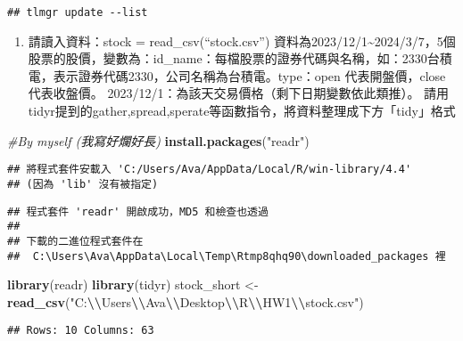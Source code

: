 \documentclass[
]{article}
\newenvironment{Shaded}{\begin{snugshade}}{\end{snugshade}}
\newcommand{\CommentTok}[1]{\textcolor[rgb]{0.56,0.35,0.01}{\textit{#1}}}
\newcommand{\FunctionTok}[1]{\textcolor[rgb]{0.13,0.29,0.53}{\textbf{#1}}}
\newcommand{\NormalTok}[1]{#1}
\newcommand{\OtherTok}[1]{\textcolor[rgb]{0.56,0.35,0.01}{#1}}
\newcommand{\SpecialCharTok}[1]{\textcolor[rgb]{0.81,0.36,0.00}{\textbf{#1}}}
\newcommand{\StringTok}[1]{\textcolor[rgb]{0.31,0.60,0.02}{#1}}
\providecommand{\tightlist}{%
  \setlength{\itemsep}{0pt}\setlength{\parskip}{0pt}}
\begin{document}
\begin{verbatim}
## tlmgr update --list
\end{verbatim}

\begin{enumerate}
\def\labelenumi{\arabic{enumi}.}
\tightlist
\item
  請讀入資料：stock = read\_csv(``stock.csv'')
  資料為2023/12/1\textasciitilde2024/3/7，5個股票的股價，變數為：id\_name：每檔股票的證券代碼與名稱，如：2330台積電，表示證券代碼2330，公司名稱為台積電。type：open
  代表開盤價，close 代表收盤價。
  2023/12/1：為該天交易價格（剩下日期變數依此類推）。
  請用tidyr提到的gather,spread,sperate等函數指令，將資料整理成下方「tidy」格式
\end{enumerate}

\begin{Shaded}
\begin{Highlighting}[]
\CommentTok{\#By myself (我寫好爛好長)}
\FunctionTok{install.packages}\NormalTok{(}\StringTok{"readr"}\NormalTok{)}
\end{Highlighting}
\end{Shaded}

\begin{verbatim}
## 將程式套件安載入 'C:/Users/Ava/AppData/Local/R/win-library/4.4'
## (因為 'lib' 沒有被指定)
\end{verbatim}

\begin{verbatim}
## 程式套件 'readr' 開啟成功，MD5 和檢查也透過
## 
## 下載的二進位程式套件在
##  C:\Users\Ava\AppData\Local\Temp\Rtmp8qhq90\downloaded_packages 裡
\end{verbatim}

\begin{Shaded}
\begin{Highlighting}[]
\FunctionTok{library}\NormalTok{(readr)}
\FunctionTok{library}\NormalTok{(tidyr)}
\NormalTok{stock\_short }\OtherTok{\textless{}{-}} \FunctionTok{read\_csv}\NormalTok{(}\StringTok{"C:}\SpecialCharTok{\textbackslash{}\textbackslash{}}\StringTok{Users}\SpecialCharTok{\textbackslash{}\textbackslash{}}\StringTok{Ava}\SpecialCharTok{\textbackslash{}\textbackslash{}}\StringTok{Desktop}\SpecialCharTok{\textbackslash{}\textbackslash{}}\StringTok{R}\SpecialCharTok{\textbackslash{}\textbackslash{}}\StringTok{HW1}\SpecialCharTok{\textbackslash{}\textbackslash{}}\StringTok{stock.csv"}\NormalTok{)}
\end{Highlighting}
\end{Shaded}

\begin{verbatim}
## Rows: 10 Columns: 63
\end{verbatim}
\end{document}
